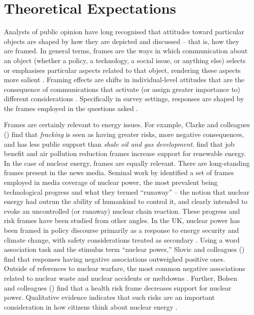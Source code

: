 \documentclass[a4paper, 11pt]{article}
\begin{document}
\section*{Theoretical Expectations}

Analysts of public opinion have long recognised that attitudes toward particular objects are shaped by how they are depicted and discussed -- that is, how they are framed. In general terms, frames are the ways in which communication about an object (whether a policy, a technology, a social issue, or anything else) selects or emphasises particular aspects related to that object, rendering these aspects more salient \citep{entman1993}. Framing effects are shifts in individual-level attitudes that are the consequence of communications that activate (or assign greater importance to) different considerations \citep{chong2007,druckman2001,nelson1997}. Specifically in survey settings, responses are shaped by the frames employed in the questions asked \citep{zaller1992}.

Frames are certainly relevant to energy issues. For example, Clarke and colleagues (\citeyear{clarke2015}) find that \emph{fracking} is seen as having greater risks, more negative consequences, and has less public support than \emph{shale oil and gas development}. \citet{stokes2017} find that job benefit and air pollution reduction frames increase support for renewable energy. In the case of nuclear energy, frames are equally relevant. There are long-standing frames present in the news media. Seminal work by \citet{gamson1989} identified a set of frames employed in media coverage of nuclear power, the most prevalent being technological progress and what they termed ``runaway'' -- the notion that nuclear energy had outrun the ability of humankind to control it, and clearly intended to evoke an uncontrolled (or runaway) nuclear chain reaction. These progress and risk frames have been studied from other angles. In the UK, nuclear power has been framed in policy discourse primarily as a response to energy security and climate change, with safety considerations treated as secondary \citep{peoples2014}. Using a word association task and the stimulus term ``nuclear power,'' Slovic and colleagues (\citeyear{slovic2000}) find that responses having negative associations outweighed positive ones. Outside of references to nuclear warfare, the most common negative associations related to nuclear waste and nuclear accidents or meltdowns \citep{slovic2000}. Further, Bolsen and colleagues (\citeyear{bolsen2014}) find that a health risk frame decreases support for nuclear power. Qualitative evidence indicates that such risks are an important consideration in how citizens think about nuclear energy \citep{bickerstaff2008}.
\end{document}
